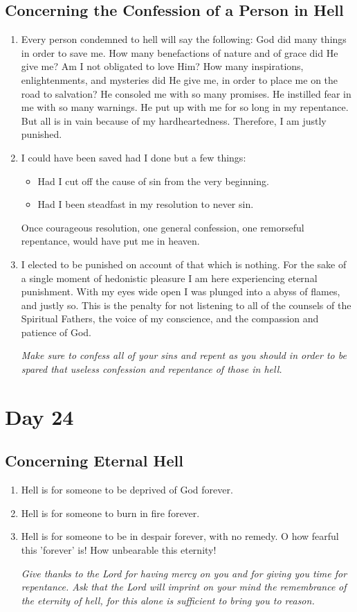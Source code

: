 \documentclass[11pt]{article}
\begin{document}
\subsection{Concerning the Confession of a Person in Hell}
\label{sec:org1310c87}
\begin{enumerate}
\item Every person condemned to hell will say the following: God did many things in order to save me. How many benefactions of nature and of grace did
He give me? Am I not obligated to love Him? How many inspirations, enlightenments, and mysteries did He give me, in order to place me on the road
to salvation? He consoled me with so many promises. He instilled fear in me with so many warnings. He put up with me for so long in my repentance.
But all is in vain because of my hardheartedness. Therefore, I am justly punished.
\item I could have been saved had I done but a few things:
\begin{itemize}
\item Had I cut off the cause of sin from the very beginning.
\item Had I been steadfast in my resolution to never sin.
\end{itemize}
Once courageous resolution, one general confession, one remorseful repentance, would have put me in heaven.
\item I elected to be punished on account of that which is nothing. For the sake of a single moment of hedonistic pleasure I am here experiencing eternal
punishment. With my eyes wide open I was plunged into a abyss of flames, and justly so. This is the penalty for not listening to all of the counsels
of the Spiritual Fathers, the voice of my conscience, and the compassion and patience of God.

\emph{Make sure to confess all of your sins and repent as you should in order to be spared that useless confession and repentance of those in hell.}
\end{enumerate}
\section{Day 24}
\label{sec:org4e11c16}
\subsection{Concerning Eternal Hell}
\label{sec:org05bd268}
\begin{enumerate}
\item Hell is for someone to be deprived of God forever.
\item Hell is for someone to burn in fire forever.
\item Hell is for someone to be in despair forever, with no remedy. O how fearful this 'forever' is! How unbearable this eternity!

\emph{Give thanks to the Lord for having mercy on you and for giving you time for repentance. Ask that the Lord will imprint on your mind the remembrance}
\emph{of the eternity of hell, for this alone is sufficient to bring you to reason.}
\end{enumerate}
\end{document}

